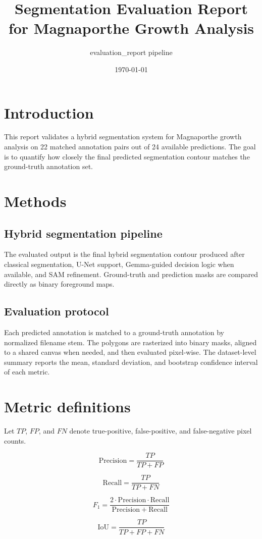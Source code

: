 \documentclass[11pt]{article}
\title{Segmentation Evaluation Report for Magnaporthe Growth Analysis}
\author{evaluation\_report pipeline}
\date{\today}
\begin{document}
\maketitle

\section{Introduction}
This report validates a hybrid segmentation system for Magnaporthe growth analysis on 22 matched annotation pairs out of 24 available predictions. The goal is to quantify how closely the final predicted segmentation contour matches the ground-truth annotation set.

\section{Methods}
\subsection{Hybrid segmentation pipeline}
The evaluated output is the final hybrid segmentation contour produced after classical segmentation, U-Net support, Gemma-guided decision logic when available, and SAM refinement. Ground-truth and prediction masks are compared directly as binary foreground maps.

\subsection{Evaluation protocol}
Each predicted annotation is matched to a ground-truth annotation by normalized filename stem. The polygons are rasterized into binary masks, aligned to a shared canvas when needed, and then evaluated pixel-wise. The dataset-level summary reports the mean, standard deviation, and bootstrap confidence interval of each metric.

\section{Metric definitions}
Let $TP$, $FP$, and $FN$ denote true-positive, false-positive, and false-negative pixel counts.

\[
\mathrm{Precision} = \frac{TP}{TP + FP}
\]

\[
\mathrm{Recall} = \frac{TP}{TP + FN}
\]

\[
F_1 = \frac{2 \cdot \mathrm{Precision} \cdot \mathrm{Recall}}{\mathrm{Precision} + \mathrm{Recall}}
\]

\[
\mathrm{IoU} = \frac{TP}{TP + FP + FN}
\]
\end{document}
